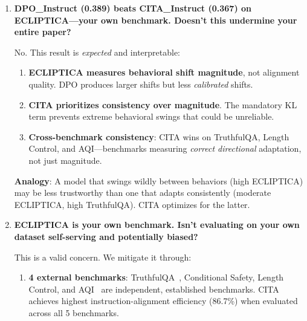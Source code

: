 \begin{enumerate}[label=\textbf{Q\arabic*.}, leftmargin=*, itemsep=8pt]
DPO's wins (ECLIPTICA, Conditional Safety) reflect higher \textit{absolute} scores, but CITA achieves more \textit{consistent} improvement across diverse benchmarks. Consistency matters for deployment reliability.

\vspace{4mm}

\item \textbf{DPO\_Instruct (0.389) beats CITA\_Instruct (0.367) on ECLIPTICA---your own benchmark. Doesn't this undermine your entire paper?}

 No. This result is \textit{expected} and interpretable:

\begin{enumerate}[leftmargin=*,itemsep=2pt]
    \item \textbf{ECLIPTICA measures behavioral shift magnitude}, not alignment quality. DPO produces larger shifts but less \textit{calibrated} shifts.

    \item \textbf{CITA prioritizes consistency over magnitude}. The mandatory KL term prevents extreme behavioral swings that could be unreliable.

    \item \textbf{Cross-benchmark consistency}: CITA wins on TruthfulQA, Length Control, and AQI---benchmarks measuring \textit{correct directional} adaptation, not just magnitude.
\end{enumerate}

\textbf{Analogy}: A model that swings wildly between behaviors (high ECLIPTICA) may be less trustworthy than one that adapts consistently (moderate ECLIPTICA, high TruthfulQA). CITA optimizes for the latter.

\vspace{4mm}

\item \textbf{ECLIPTICA is your own benchmark. Isn't evaluating on your own dataset self-serving and potentially biased?}

 This is a valid concern. We mitigate it through:

\begin{enumerate}[leftmargin=*,itemsep=2pt]
    \item \textbf{4 external benchmarks}: TruthfulQA~\cite{lin2022truthfulqa}, Conditional Safety, Length Control, and AQI~\cite{hendrycks2023aligning} are independent, established benchmarks. CITA achieves highest instruction-alignment efficiency (86.7\%) when evaluated across all 5 benchmarks.


\end{enumerate}
\end{enumerate}
